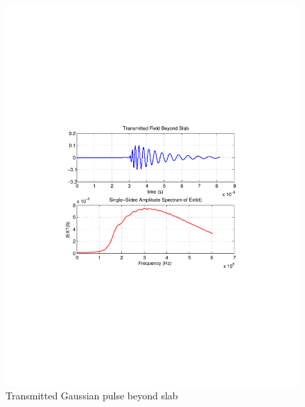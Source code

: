 \begin{figure}[H]
\centering
\includegraphics[scale=0.8, trim=3.5cm 8.7cm 4.5cm 8.85cm, clip]{Figures/FigCh03_TransmittedFieldBeyondSlab.pdf}
\caption{Transmitted Gaussian pulse beyond slab}
\label{1DDNG-Transmitted-Gaussian-Pulse-Beyond-Slab}
\end{figure}
